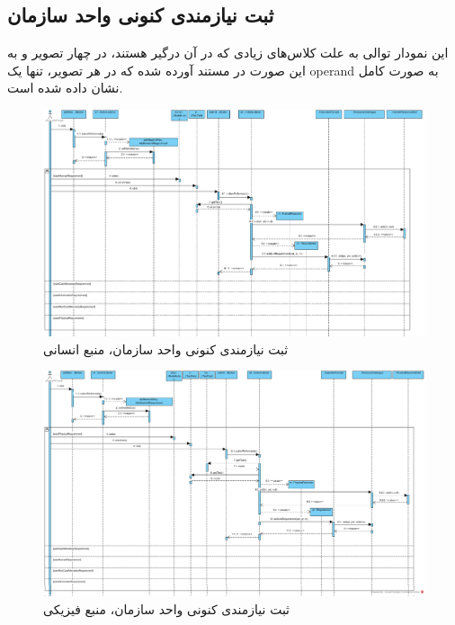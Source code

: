\begin{landscape}
\section{ثبت نیازمندی کنونی واحد سازمان}
این نمودار توالی به علت کلاس‌های زیادی که در آن درگیر هستند، در چهار تصویر و به این صورت در مستند آورده شده که در هر تصویر، تنها یک operand به صورت کامل نشان داده شده است.
\begin{figure}[H]
	\centering
	\includegraphics[scale=0.5]{img/sequence-design/AddRequirementToUnit_HUMAN}
	\caption{ثبت نیازمندی کنونی واحد سازمان، منبع انسانی}
\end{figure}
\begin{figure}[H]
	\centering
	\includegraphics[scale=0.5]{img/sequence-design/AddRequirementToUnit_PHYSICAL}
	\caption{ثبت نیازمندی کنونی واحد سازمان، منبع فیزیکی}
\end{figure}
\begin{figure}[H]
	\centering

\end{figure}
\end{landscape}
